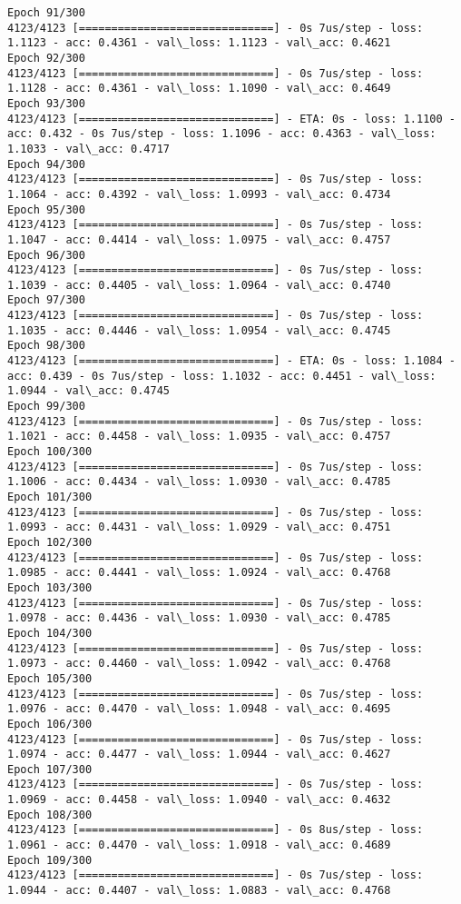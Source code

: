 \documentclass[11pt]{article}
\begin{document}
\begin{Verbatim}[commandchars=\\\{\}]
Epoch 91/300
4123/4123 [==============================] - 0s 7us/step - loss: 1.1123 - acc: 0.4361 - val\_loss: 1.1123 - val\_acc: 0.4621
Epoch 92/300
4123/4123 [==============================] - 0s 7us/step - loss: 1.1128 - acc: 0.4361 - val\_loss: 1.1090 - val\_acc: 0.4649
Epoch 93/300
4123/4123 [==============================] - ETA: 0s - loss: 1.1100 - acc: 0.432 - 0s 7us/step - loss: 1.1096 - acc: 0.4363 - val\_loss: 1.1033 - val\_acc: 0.4717
Epoch 94/300
4123/4123 [==============================] - 0s 7us/step - loss: 1.1064 - acc: 0.4392 - val\_loss: 1.0993 - val\_acc: 0.4734
Epoch 95/300
4123/4123 [==============================] - 0s 7us/step - loss: 1.1047 - acc: 0.4414 - val\_loss: 1.0975 - val\_acc: 0.4757
Epoch 96/300
4123/4123 [==============================] - 0s 7us/step - loss: 1.1039 - acc: 0.4405 - val\_loss: 1.0964 - val\_acc: 0.4740
Epoch 97/300
4123/4123 [==============================] - 0s 7us/step - loss: 1.1035 - acc: 0.4446 - val\_loss: 1.0954 - val\_acc: 0.4745
Epoch 98/300
4123/4123 [==============================] - ETA: 0s - loss: 1.1084 - acc: 0.439 - 0s 7us/step - loss: 1.1032 - acc: 0.4451 - val\_loss: 1.0944 - val\_acc: 0.4745
Epoch 99/300
4123/4123 [==============================] - 0s 7us/step - loss: 1.1021 - acc: 0.4458 - val\_loss: 1.0935 - val\_acc: 0.4757
Epoch 100/300
4123/4123 [==============================] - 0s 7us/step - loss: 1.1006 - acc: 0.4434 - val\_loss: 1.0930 - val\_acc: 0.4785
Epoch 101/300
4123/4123 [==============================] - 0s 7us/step - loss: 1.0993 - acc: 0.4431 - val\_loss: 1.0929 - val\_acc: 0.4751
Epoch 102/300
4123/4123 [==============================] - 0s 7us/step - loss: 1.0985 - acc: 0.4441 - val\_loss: 1.0924 - val\_acc: 0.4768
Epoch 103/300
4123/4123 [==============================] - 0s 7us/step - loss: 1.0978 - acc: 0.4436 - val\_loss: 1.0930 - val\_acc: 0.4785
Epoch 104/300
4123/4123 [==============================] - 0s 7us/step - loss: 1.0973 - acc: 0.4460 - val\_loss: 1.0942 - val\_acc: 0.4768
Epoch 105/300
4123/4123 [==============================] - 0s 7us/step - loss: 1.0976 - acc: 0.4470 - val\_loss: 1.0948 - val\_acc: 0.4695
Epoch 106/300
4123/4123 [==============================] - 0s 7us/step - loss: 1.0974 - acc: 0.4477 - val\_loss: 1.0944 - val\_acc: 0.4627
Epoch 107/300
4123/4123 [==============================] - 0s 7us/step - loss: 1.0969 - acc: 0.4458 - val\_loss: 1.0940 - val\_acc: 0.4632
Epoch 108/300
4123/4123 [==============================] - 0s 8us/step - loss: 1.0961 - acc: 0.4470 - val\_loss: 1.0918 - val\_acc: 0.4689
Epoch 109/300
4123/4123 [==============================] - 0s 7us/step - loss: 1.0944 - acc: 0.4407 - val\_loss: 1.0883 - val\_acc: 0.4768

\end{Verbatim}
\end{document}
